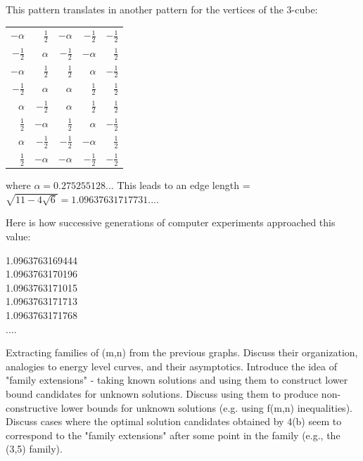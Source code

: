 \documentclass[superscriptaddress,reprint,amsmath,amssymb,aps]{revtex4-1}
\begin{document}
This pattern translates in another pattern for the vertices of the 3-cube:
\newcommand{\half}{\frac{1}{2}}
\begin{center}
\renewcommand{\arraystretch}{1.4}
\begin{supertabular}{rrrrr}
    $-\alpha$ & $ \half $ & $-\alpha$ & $-\half $ & $-\half $ \\
    $-\half $ & $ \alpha$ & $-\half $ & $-\alpha$ & $ \half $ \\
    $-\alpha$ & $ \half $ & $ \half $ & $ \alpha$ & $-\half $ \\
    $-\half $ & $ \alpha$ & $ \alpha$ & $ \half $ & $ \half $ \\
    $ \alpha$ & $-\half $ & $ \alpha$ & $ \half $ & $ \half $ \\
    $ \half $ & $-\alpha$ & $ \half $ & $ \alpha$ & $-\half $ \\
    $ \alpha$ & $-\half $ & $-\half $ & $-\alpha$ & $ \half $ \\
    $ \half $ & $-\alpha$ & $-\alpha$ & $-\half $ & $-\half $ \\
\end{supertabular}
\end{center}
where $\alpha = 0.275255128...$
This leads to an edge length = $\sqrt{11 - 4\sqrt{6}} = 1.09637631717731....$

Here is how successive generations of computer experiments approached this
value:
\vspace{-0.05in}
\begin{center}
1.0963763169444 \\
\vspace{-0.02in}
1.0963763170196 \\
\vspace{-0.02in}
1.0963763171015 \\
\vspace{-0.02in}
1.0963763171713 \\
\vspace{-0.02in}
1.0963763171768 \\
\vspace{-0.05in}
....
\end{center}
\vspace{-0.05in}

\vspace{-0.15in}
Extracting families of (m,n) from the previous graphs.  Discuss their
organization, analogies to energy level curves, and their asymptotics.
Introduce the idea of "family extensions" - taking known solutions and
using them to construct lower bound candidates for unknown solutions.
Discuss using them to produce non-constructive lower bounds for unknown
solutions (e.g. using f(m,n) inequalities).  Discuss cases where the
optimal solution candidates obtained by 4(b) seem to correspond to the
"family extensions" after some point in the family (e.g., the (3,5)
family).
\end{document}

